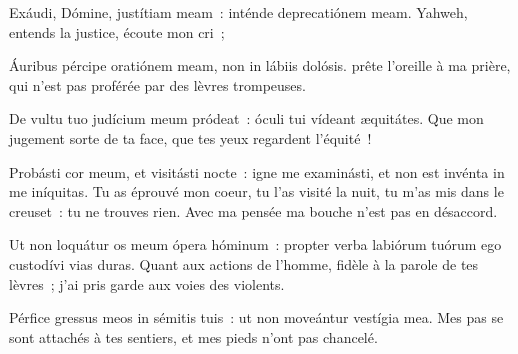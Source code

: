 
\begin{paracol}{2}

\LigneParacol{0cm}
{Exáudi, Dómine, justítiam meam~: \GreStar{} inténde deprecatiónem meam.}
{Yahweh, entends la justice, écoute mon cri~;}

\LigneParacol{0.2cm}
{Áuribus pércipe oratiónem meam, \GreStar{} non in lábiis dolósis.}
{prête l'oreille à ma prière, qui n'est pas proférée par des lèvres trompeuses. }

\LigneParacol{0.2cm}
{De vultu tuo judícium meum pródeat~: \GreStar{} óculi tui vídeant æquitátes.}
{Que mon jugement sorte de ta face, que tes yeux regardent l'équité~! }

\LigneParacol{0.2cm}
{Probásti cor meum, et visitásti nocte~: \GreStar{} igne me examinásti, et non est invénta in me iníquitas.}
{Tu as éprouvé mon coeur, tu l'as visité la nuit, tu m'as mis dans le creuset~: tu ne trouves rien. Avec ma pensée ma bouche n'est pas en désaccord. }

\LigneParacol{0.2cm}
{Ut non loquátur os meum ópera hóminum~: \GreStar{} propter verba labiórum tuórum ego custodívi vias duras.}
{Quant aux actions de l'homme, fidèle à la parole de tes lèvres~; j'ai pris garde aux voies des violents. }

\LigneParacol{0.2cm}
{Pérfice gressus meos in sémitis tuis~: \GreStar{} ut non moveántur vestígia mea.}
{Mes pas se sont attachés à tes sentiers, et mes pieds n'ont pas chancelé. }

\end{paracol}
\Gloria
